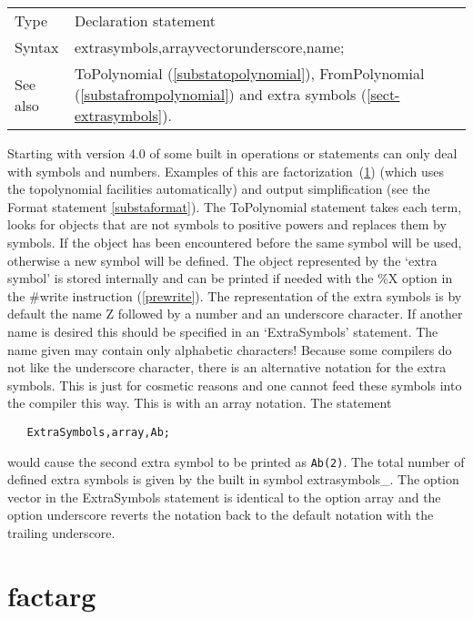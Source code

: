 \noindent \begin{tabular}{ll}
Type & Declaration statement\\
Syntax & extrasymbols,array\textbar{}vector\textbar{}underscore,name;
\\ See also & ToPolynomial (\ref{substatopolynomial}), FromPolynomial 
(\ref{substafrompolynomial}) and extra symbols 
(\ref{sect-extrasymbols}).
\end{tabular} \vspace{4mm}

\noindent Starting with version 4.0 of \FORM{} some built in operations or
statements can only deal with symbols and numbers. Examples of this are 
factorization~(\ref{substafactarg}) (which uses the topolynomial facilities 
automatically) and output simplification (see the Format 
statement \ref{substaformat}).
The ToPolynomial statement takes each term, looks for 
objects that are not symbols to positive powers and replaces them by 
symbols. If the object has been encountered before the same symbol will be 
used, otherwise a new symbol will be defined. The object represented by the 
`extra symbol' is stored internally and can be printed 
if needed with the \%X option in the \#write instruction (\ref{prewrite}). 
The representation of the extra symbols is by default the name Z followed 
by a number and an underscore character. If another name is desired this 
should be specified in an `ExtraSymbols' statement. The name given may 
contain only alphabetic characters! Because some compilers do not like the 
underscore character, there is an alternative notation for the extra 
symbols. This is just for cosmetic reasons and one cannot feed these 
symbols into the compiler this way. This is with an array notation. The 
statement
\begin{verbatim}
   ExtraSymbols,array,Ab;
\end{verbatim}
would cause the second extra symbol to be printed as {\tt Ab(2)}. The total 
number of defined extra symbols is given by the built in symbol 
extrasymbols\_.
The option vector in the ExtraSymbols statement is identical to the option 
array and the option underscore reverts the notation back to the default 
notation with the trailing underscore.
\vspace{10mm}


\section{factarg}
\label{substafactarg}

